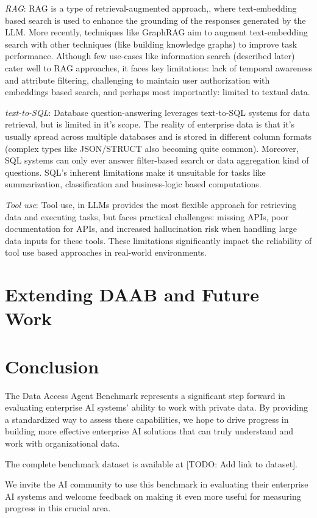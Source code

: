 \documentclass[11pt,a4paper]{article}
\begin{document}
\textit{RAG}: RAG is a type of retrieval-augmented approach\cite{10},\cite{11},\cite{36} where text-embedding based search is used to enhance the grounding of the responses generated by the LLM. More recently, techniques like GraphRAG\cite{41} aim to augment text-embedding search with other techniques (like building knowledge graphs) to improve task performance. Although few use-cases like information search (described later) cater well to RAG approaches, it faces key limitations: lack of temporal awareness and attribute filtering, challenging to maintain user authorization with embeddings based search, and perhaps most importantly: limited to textual data.

\textit{text-to-SQL}: Database question-answering leverages text-to-SQL\cite{12} systems for data retrieval, but is limited in it's scope. The reality of  enterprise data is that it's usually spread across multiple databases and is stored in different column formats (complex types like JSON/STRUCT also becoming quite common). Moreover, SQL systems can only ever answer filter-based search or data aggregation kind of questions. SQL's inherent limitations make it unsuitable for tasks like summarization, classification and business-logic based computations.

\textit{Tool use}: Tool use\cite{25}, \cite{30} in LLMs provides the most flexible approach for retrieving data and executing tasks, but faces practical challenges: missing APIs, poor documentation for APIs, and increased hallucination risk when handling large data inputs for these tools. These limitations significantly impact the reliability of tool use based approaches in real-world environments.


\section{Extending DAAB and Future Work}



\section{Conclusion}

The Data Access Agent Benchmark represents a significant step forward in evaluating enterprise AI systems' ability to work with private data. By providing a standardized way to assess these capabilities, we hope to drive progress in building more effective enterprise AI solutions that can truly understand and work with organizational data.

The complete benchmark dataset is available at [TODO: Add link to dataset].

We invite the AI community to use this benchmark in evaluating their enterprise AI systems and welcome feedback on making it even more useful for measuring progress in this crucial area.



\printbibliography
\end{document}
